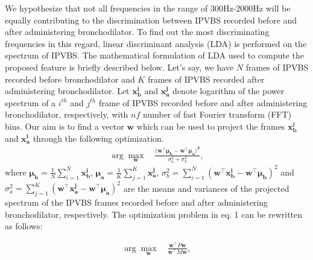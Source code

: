 \documentclass{article}
\begin{document}
We hypothesize that not all frequencies in the range of 300Hz-2000Hz will be equally contributing to the discrimination between IPVBS recorded before and after administering bronchodilator. To find out the most discriminating frequencies in this regard, linear discriminant analysis (LDA) is performed on the spectrum of IPVBS. The mathematical formulation of LDA used to compute the proposed feature is briefly described below. Let's say, we have \(N\) frames of IPVBS recorded before bronchodilator and \(K\) frames of IPVBS recorded after administering bronchodilator. Let \(\boldsymbol{x^i_b}\) and \(\boldsymbol{x^j_a}\) denote logarithm of the power spectrum of a $i^{th}$ and $j^{th}$ frame of IPVBS recorded before and after administering bronchodilator, respectively, with \(nf\) number of fast Fourier transform (FFT) bins. Our aim is to find a vector $\boldsymbol{w}$ which can be used to project the frames  \(\boldsymbol{x^i_b}\) and  \(\boldsymbol{x^i_a}\) through the following optimization.
\begin{equation}
\begin{aligned}
\arg\max_{\boldsymbol{w}} \quad  \frac{(\boldsymbol{w^\intercal \mu_b-\boldsymbol{w^\intercal \mu_a)}^2}}{\sigma_{a}^2+\sigma_{b}^2},
\end{aligned}
\end{equation}
where \(\boldsymbol{\mu_b}=\frac{1}{N}\sum_{i=1}^{N}\boldsymbol{x^i_b}\), \(\boldsymbol{\mu_a}=\frac{1}{K}\sum_{j=1}^{K}\boldsymbol{x^j_a}\), \(\sigma_b^2=\sum_{i=1}^{N}(\boldsymbol{w^\intercal x_b^i-w^\intercal \mu_b})^2\) and \(\sigma_a^2=\sum_{j=1}^{K}(\boldsymbol{w^\intercal x_a^j-w^\intercal \mu_a})^2\) are the means and variances of the projected spectrum of the IPVBS frames recorded before and after administering bronchodilator, respectively. The optimization problem in eq. 1 can be rewritten as follows:
						

\begin{equation}
\begin{aligned}
\arg\max_{\boldsymbol{w}} \quad  \frac{\boldsymbol{w^\intercal}P\boldsymbol{w}}{\boldsymbol{w^\intercal}M\boldsymbol{w}},\\
\end{aligned}
\end{equation}
\end{document}
